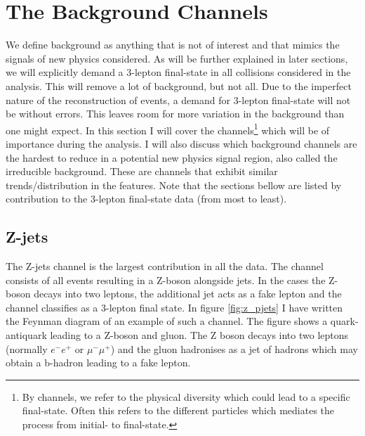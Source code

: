 \section{The Background Channels}\label{sec:bkg}
We define background as anything that is not of interest and that mimics the signals of new physics considered. 
As will be further explained in  later sections, we will explicitly demand a 3-lepton final-state in all collisions 
considered in the analysis. This will remove a lot of background, but not all. Due to the imperfect nature of the 
reconstruction of events, a demand for 3-lepton final-state will not be without errors. This leaves room for more 
variation in the background than one might expect. In this section I will cover the channels\footnote{By channels,
we refer to the physical diversity which could lead to a specific final-state. Often this refers to 
the different particles which mediates the process from initial- to final-state.} which will 
be of importance during the analysis. I will also discuss which background channels are the hardest 
to reduce in a potential new physics signal region, also called the irreducible background. These are 
channels that exhibit similar trends/distribution in the features. Note that the sections bellow
are listed by contribution to the 3-lepton final-state data (from most to least).  

\subsection{Z-jets}
The Z-jets channel is the largest contribution in all the data. The channel consists of all events
resulting in a Z-boson alongside jets. In the cases the Z-boson decays into two leptons, the additional 
jet acts as a fake lepton and the channel classifies as a 3-lepton final state. In figure \ref{fig:z_pjets} 
I have written the Feynman diagram of an example of such a channel. The figure shows a quark-antiquark leading 
to a Z-boson and gluon. The Z boson decays into two leptons (normally 
$e^-e^+$ or $\mu^- \mu^+$) and the gluon hadronises as a jet of hadrons which may obtain a b-hadron leading to a 
fake lepton. 

